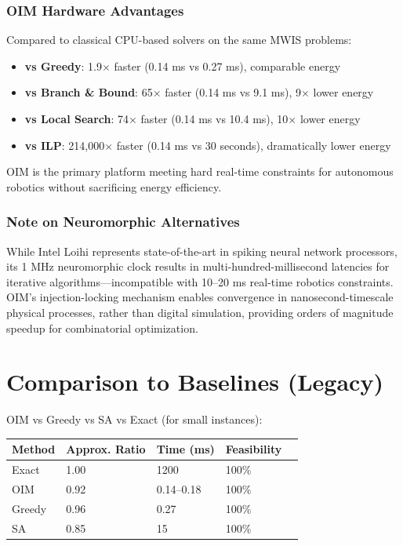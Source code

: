 \subsubsection{OIM Hardware Advantages}

Compared to classical CPU-based solvers on the same MWIS problems:

\begin{itemize}
\item \textbf{vs Greedy}: 1.9$\times$ faster (0.14 ms vs 0.27 ms), comparable energy
\item \textbf{vs Branch \& Bound}: 65$\times$ faster (0.14 ms vs 9.1 ms), 9$\times$ lower energy
\item \textbf{vs Local Search}: 74$\times$ faster (0.14 ms vs 10.4 ms), 10$\times$ lower energy
\item \textbf{vs ILP}: 214,000$\times$ faster (0.14 ms vs 30 seconds), dramatically lower energy
\end{itemize}

OIM is the primary platform meeting hard real-time constraints for autonomous robotics without sacrificing energy efficiency.

\subsubsection{Note on Neuromorphic Alternatives}

While Intel Loihi \cite{Davies2018} represents state-of-the-art in spiking neural network processors, its 1 MHz neuromorphic clock results in multi-hundred-millisecond latencies for iterative algorithms---incompatible with 10--20 ms real-time robotics constraints. OIM's injection-locking mechanism enables convergence in nanosecond-timescale physical processes, rather than digital simulation, providing orders of magnitude speedup for combinatorial optimization.

\section{Comparison to Baselines (Legacy)}

OIM vs Greedy vs SA vs Exact (for small instances):

\begin{center}
\begin{tabular}{lllll}
\toprule
Method & Approx. Ratio & Time (ms) & Feasibility \\ \midrule
Exact & 1.00 & 1200 & 100\% \\
OIM & 0.92 & 0.14--0.18 & 100\% \\
Greedy & 0.96 & 0.27 & 100\% \\
SA & 0.85 & 15 & 100\% \\
\bottomrule
\end{tabular}
\end{center}

